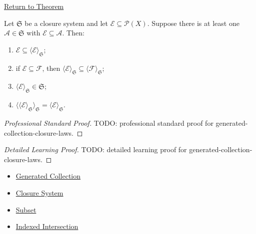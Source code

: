 \newpage
{}
\label{prf:generated-collection-closure-laws}

\begin{remark*}[Return]
\hyperref[thm:generated-collection-closure-laws]{Return to Theorem}
\end{remark*}

\begin{theorem*}
Let $\mathfrak{S}$ be a closure system and let
$\mathcal{E}\subseteq\mathcal{P}(X)$.  Suppose there is at least one
$\mathcal{A}\in\mathfrak{S}$ with $\mathcal{E}\subseteq\mathcal{A}$.  Then:
\begin{enumerate}[label=(\roman*)]
\item $\mathcal{E}\subseteq\langle\mathcal{E}\rangle_{\mathfrak{S}}$;
\item if $\mathcal{E}\subseteq\mathcal{F}$, then
      $\langle\mathcal{E}\rangle_{\mathfrak{S}}
      \subseteq
      \langle\mathcal{F}\rangle_{\mathfrak{S}}$;
\item $\langle\mathcal{E}\rangle_{\mathfrak{S}}\in\mathfrak{S}$;
\item
      $\langle\langle\mathcal{E}\rangle_{\mathfrak{S}}\rangle_{\mathfrak{S}}
      =
      \langle\mathcal{E}\rangle_{\mathfrak{S}}$.
\end{enumerate}
\end{theorem*}

\begin{proof}[Professional Standard Proof]
\LRAProofBodyStart
TODO: professional standard proof for generated-collection-closure-laws.
\end{proof}

\begin{proof}[Detailed Learning Proof]
\LRAProofBodyStart
TODO: detailed learning proof for generated-collection-closure-laws.
\end{proof}

\begin{remark*}
\end{remark*}

\begin{dependencies}
\begin{itemize}
  \item \hyperref[def:generated-collection]{Generated Collection}
  \item \hyperref[def:closure-system]{Closure System}
  \item \hyperref[def:subset]{Subset}
  \item \hyperref[def:indexed-intersection]{Indexed Intersection}
\end{itemize}
\end{dependencies}

\clearpage
